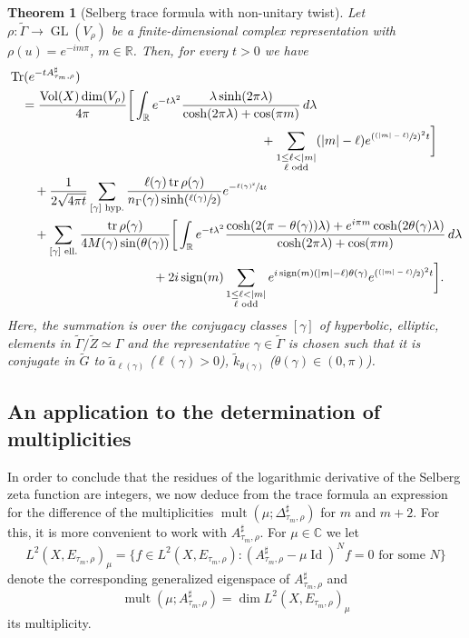 \documentclass[10pt]{amsart}
\newcommand{\psfrac}[2]{\sfrac{(#1)}{#2}}
\theoremstyle{plain}
\newtheorem{theorem}[thm]{Theorem}
\theoremstyle{definition}
\theoremstyle{remark}
\newcommand{\R}{\mathbb{R}}
\newcommand{\C}{\mathbb{C}}
\DeclareMathOperator{\GL}{GL}
\DeclareMathOperator{\Tr}{Tr}
\DeclareMathOperator{\tr}{tr}
\DeclareMathOperator{\Vol}{Vol}
\DeclareMathOperator{\Id}{Id}
\DeclareMathOperator{\sign}{sign}
\numberwithin{equation}{section}
\DeclareMathOperator{\mult}{mult}
\begin{document}
\begin{theorem}[Selberg trace formula with non-unitary twist]\label{thm:TraceFormula}
Let $\rho:\widetilde{\Gamma}\to\GL(V_\rho)$ be a finite-dimensional complex representation with $\rho(u)=e^{-im\pi}$, $m\in\R$. Then, for every $t>0$ we have
\begin{align*}
& \Tr(e^{-tA_{\tau_m,\rho}^\sharp})\\
& \quad=\frac{\Vol(X)\dim(V_\rho)}{4\pi}\bigg[\int_\R e^{-t\lambda^2}\frac{\lambda\sinh(2\pi\lambda)}{\cosh(2\pi\lambda)+\cos(\pi m)}\,d\lambda\\
& \hspace{7cm}+ \sum_{\substack{1\leq\ell<|m|\\\ell\textup{ odd}}}(|m|-\ell)e^{(\psfrac{|m|-\ell}{2})^2t}\bigg]\\
& \qquad+\frac{1}{2\sqrt{4\pi t}}\sum_{[\gamma]\textup{ hyp.}}\frac{\ell(\gamma)\tr\rho(\gamma)}{n_\Gamma(\gamma)\sinh(\sfrac{\ell(\gamma)}{2})}e^{-\sfrac{\ell(\gamma)^2}{4t}}\\
& \qquad+\sum_{[\gamma]\textup{ ell.}} \frac{\tr\rho(\gamma)}{4M(\gamma)\sin(\theta(\gamma))}\bigg[\int_\R e^{-t\lambda^2}\frac{\cosh(2(\pi-\theta(\gamma))\lambda)+e^{i\pi m}\cosh(2\theta(\gamma)\lambda)}{\cosh(2\pi\lambda)+\cos(\pi m)}\,d\lambda\\
& \hspace{4cm}+2i\sign(m)\sum_{\substack{1\leq\ell<|m|\\\ell\textup{ odd}}}e^{i\sign(m)(|m|-\ell)\theta(\gamma)}e^{(\psfrac{|m|-\ell}{2})^2t}\bigg].
\end{align*}
Here, the summation is over the conjugacy classes $[\gamma]$ of hyperbolic, \resp elliptic, elements in $\widetilde{\Gamma}/\widetilde{Z}\simeq\Gamma$ and the representative $\gamma\in\widetilde{\Gamma}$ is chosen such that it is conjugate in $\widetilde{G}$ to $\widetilde{a}_{\ell(\gamma)}$ ($\ell(\gamma)>0$), \resp $\widetilde{k}_{\theta(\gamma)}$ ($\theta(\gamma)\in(0,\pi)$).
\end{theorem}

\subsection{An application to the determination of multiplicities}
\label{subsec:mult}
In order to conclude that the residues of the logarithmic derivative of the Selberg zeta function are integers, we now deduce from the trace formula an expression for the difference of the multiplicities $\mult(\mu;\Delta_{\tau_m,\rho}^\sharp)$ for $m$ and $m+2$. For this, it is more convenient to work with $A_{\tau_m,\rho}^\sharp$. For $\mu\in\C$ we let
\[
L^2(X,E_{\tau_m,\rho})_\mu = \{f\in L^2(X,E_{\tau_m,\rho}):(A_{\tau_m,\rho}^\sharp-\mu\Id)^Nf=0\mbox{ for some }N\}
\]
denote the corresponding generalized eigenspace of $A_{\tau_m,\rho}^\sharp$ and
\[
\mult(\mu;A_{\tau_m,\rho}^\sharp) = \dim L^2(X,E_{\tau_m,\rho})_\mu
\]
its multiplicity.
\end{document}
